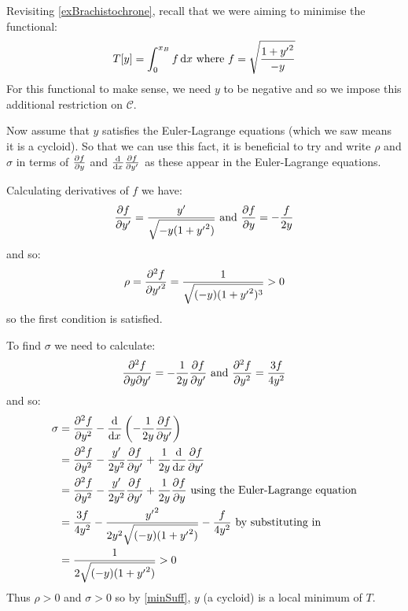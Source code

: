 \documentclass[../main.tex]{subfiles}
\begin{document}
\begin{example}
  Revisiting \cref{exBrachistochrone}, recall that we were aiming to minimise the functional:
  \[
    T[y] = \int_{0}^{x_B} f \d{x} \text{ where } f= \sqrt{\frac{1 + {y'}^2}{- y}}
  \]
  For this functional to make sense, we need $y$ to be negative and so we impose this additional restriction on $\mathscr{C}$.

  Now assume that $y$ satisfies the Euler-Lagrange equations (which we saw means it is a cycloid).
  So that we can use this fact, it is beneficial to try and write $\rho$ and $\sigma$ in terms of $\pderiv{f}{y}$ and $\deriv{}{x}\pderiv{f}{y'}$ as these appear in the Euler-Lagrange equations.

  Calculating derivatives of $f$ we have:
  \[
    \pderiv{f}{{y'}} = \frac{y'}{\sqrt{-y(1 + {y'}^2)}} \text{ and } \pderiv{f}{y} = - \frac{f}{2y}
  \]
  and so:
  \[
    \rho = \pderiv[2]{f}{{y'}} = \frac{1}{\sqrt{(-y)(1 + {y'}^2)^3}} > 0
  \]
  so the first condition is satisfied.

  To find $\sigma$ we need to calculate:
  \[
    \frac{\partial^2 f}{\partial y \partial y'} = - \frac{1}{2y} \pderiv{f}{y'} \text{ and } \pderiv[2]{f}{y} = \frac{3f}{4y^2}
  \]
  and so:
  \begin{align*}
    \sigma &= \pderiv[2]{f}{y} - \deriv{}{x}\left(-\frac{1}{2y} \pderiv{f}{{y'}}\right) \\
           &= \pderiv[2]{f}{y} - \frac{y'}{2y^2} \pderiv{f}{{y'}} + \frac{1}{2y} \deriv{}{x} \pderiv{f}{y'} \\
           &= \pderiv[2]{f}{y} - \frac{y'}{2y^2} \pderiv{f}{{y'}} + \frac{1}{2y} \pderiv{f}{y} \text{ using the Euler-Lagrange equation} \\
           &= \frac{3f}{4y^2} - \frac{{y'}^2}{2y^2\sqrt{(-y)(1 + {y'}^2)}} - \frac{f}{4y^2} \text{ by substituting in} \\
           &= \frac{1}{2\sqrt{(-y)(1 + {y'}^2)}} > 0
  \end{align*}
  Thus $\rho > 0$ and $\sigma > 0$ so by \cref{minSuff}, $y$ (a cycloid) is a local minimum of $T$.
\end{example}
\end{document}
